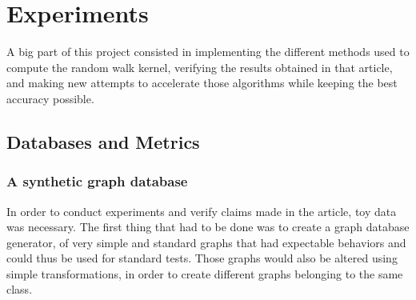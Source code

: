 \documentclass{article}
\theoremstyle{definition}
\begin{document}
\newpage
\section{Experiments}
A big part of this project consisted in implementing the different methods used to compute the random walk kernel\cite{vishwanathan_graph_2010}, verifying the results obtained in that article, and making new attempts to accelerate those algorithms while keeping the best accuracy possible.
\subsection{Databases and Metrics}
\subsubsection{A synthetic graph database}
In order to conduct experiments and verify claims made in the article, toy data was necessary. The first thing that had to be done was to create a graph database generator, of very simple and standard graphs that had expectable behaviors and could thus be used for standard tests. Those graphs would also be altered using simple transformations, in order to create different graphs belonging to the same class.
\end{document}
